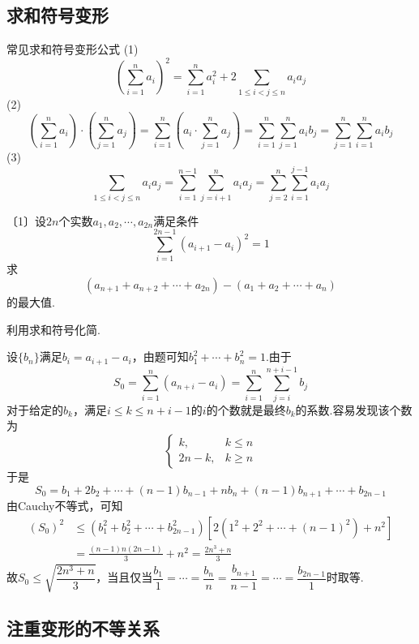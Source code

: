 \documentclass[cn,hazy,black,10pt,normal]{elegantnote}
\newcommand{\nd}[1]{〔#1〕}
\newcommand{\ssb}[1]{\left( #1 \right)}
\begin{document}
\subsection{求和符号变形}

\begin{proposition}{常见求和符号变形公式}
	(1)$$\ssb{ \sum_{i=1}^{n} a_i }^2 = \sum_{i=1}^{n} a_i^2 + 2 \sum_{1 \leq i < j \leq n} a_ia_j$$
	(2)$$\ssb{ \sum_{i=1}^{n} a_i } \cdot \ssb{ \sum_{j=1}^{n} a_j } = \sum_{i=1}^{n} \ssb{a_i \cdot \sum_{j=1}^{n} a_j} = \sum_{i=1}^{n} \sum_{j=1}^{n} a_ib_j = \sum_{j=1}^{n} \sum_{i=1}^{n} a_ib_j$$
	(3)$$\sum_{1 \leq i < j \leq n} a_ia_j = \sum_{i=1}^{n-1} \sum_{j=i+1}^{n} a_ia_j = \sum_{j=2}^{n} \sum_{i=1}^{j-1} a_ia_j$$
\end{proposition}

\begin{problem} %
	\nd{1}设$2n$个实数$a_1,a_2, \cdots ,a_{2n}$满足条件$$\sum_{i=1}^{2n-1} (a_{i+1}-a_i)^2 = 1$$
	求$$(a_{n+1} + a_{n+2} + \cdots + a_{2n}) - (a_{1} + a_{2} + \cdots + a_{n})$$的最大值.
\end{problem}
\begin{hint}
	利用求和符号化简.
\end{hint}
\begin{solution}
	设$\{ b_n \}$满足$b_i = a_{i+1} - a_i$，由题可知$b_1^2 + \cdots + b_n^2 = 1$.由于$$S_0 = \sum_{i=1}^{n} (a_{n+i} - a_i) = \sum_{i=1}^{n} \sum_{j=i}^{n+i-1} b_j$$
	对于给定的$b_k$，满足$i \leq k \leq n+i-1$的$i$的个数就是最终$b_k$的系数.容易发现该个数为$$
	\begin{cases}
		k, \quad &k \leq n \\
		2n-k, & k \geq n
	\end{cases}$$
	于是$$S_0 = b_1+2b_2 + \cdots + (n-1)b_{n-1} + nb_n + (n-1)b_{n+1} + \cdots + b_{2n-1}$$
	由Cauchy不等式，可知
	\begin{align*}
		(S_0)^2 &\leq (b_1^2+b_2^2 + \cdots + b_{2n-1}^2)[2(1^2+2^2 + \cdots + (n-1)^2)+n^2] \\
		&= \frac{(n-1)n(2n-1)}{3} + n^2 = \frac{2n^3+n}{3}
	\end{align*}
	故$S_0 \leq \sqrt{\dfrac{2n^3+n}{3}}$，当且仅当$\dfrac{b_1}{1} = \cdots = \dfrac{b_n}{n} = \dfrac{b_{n+1}}{n-1} = \cdots = \dfrac{b_{2n-1}}{1}$时取等.
\end{solution}

\subsection{注重变形的不等关系}
\end{document}
